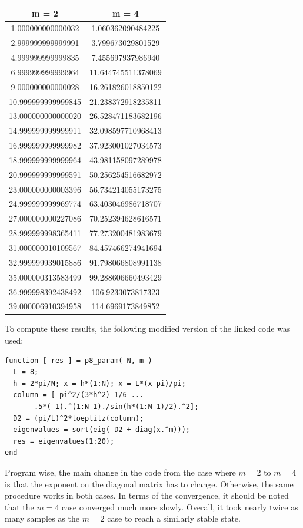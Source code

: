 \documentclass{article}
\begin{document}
\begin{center}
\begin{tabular}{|c|c|}
\hline
m = 2 & m = 4 \\
\hline
   1.000000000000032 &  1.060362090484225 \\
   2.999999999999991 &	3.799673029801529 \\
   4.999999999999835 &  7.455697937986940 \\
   6.999999999999964 &  11.644745511378069  \\
   9.000000000000028 &  16.261826018850122 \\
  10.999999999999845 &  21.238372918235811 \\
  13.000000000000020 &  26.528471183682196 \\
  14.999999999999911 &  32.098597710968413 \\
  16.999999999999982 &  37.923001027034573 \\
  18.999999999999964 &  43.981158097289978 \\
  20.999999999999591 &  50.256254516682972 \\
  23.000000000003396 &  56.734214055173275 \\
  24.999999999969774 &  63.403046986718707 \\
  27.000000000227086 &  70.252394628616571 \\
  28.999999998365411 &  77.273200481983679 \\
  31.000000010109567 &  84.457466274941694 \\
  32.999999939015886 &  91.798066808991138 \\
  35.000000313583499 &  99.288606660493429 \\
  36.999998392438492 & 106.9233073817323 \\
  39.000006910394958 & 114.6969173849852 \\
\hline
\end{tabular}
\end{center}

To compute these results, the following modified version of the linked code was used:

\begin{verbatim}
function [ res ] = p8_param( N, m )
  L = 8;                            
  h = 2*pi/N; x = h*(1:N); x = L*(x-pi)/pi;
  column = [-pi^2/(3*h^2)-1/6 ...
      -.5*(-1).^(1:N-1)./sin(h*(1:N-1)/2).^2];
  D2 = (pi/L)^2*toeplitz(column); 
  eigenvalues = sort(eig(-D2 + diag(x.^m)));
  res = eigenvalues(1:20);
end
\end{verbatim}

Program wise, the main change in the code from the case where $m=2$ to $m=4$ is that the exponent on the diagonal matrix has to change.  Otherwise, the same procedure works in both cases.  In terms of the convergence, it should be noted that the $m=4$ case converged much more slowly.  Overall, it took nearly twice as many samples as the $m=2$ case to reach a similarly stable state.
\end{document}
